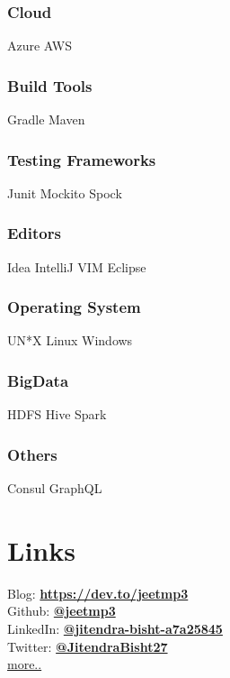 \documentclass[]{resume}
\begin{document}
\begin{minipage}[t]{0.33\textwidth}
        \subsubsection{Cloud}
        \textbullet{} Azure \textbullet{} AWS\\
        \subsubsection{Build Tools}
        \textbullet{} Gradle \textbullet{} Maven\\
        \subsubsection{Testing Frameworks}
        \textbullet{} Junit \textbullet{} Mockito \textbullet{} Spock\\
        \subsubsection{Editors}
        \textbullet{} Idea IntelliJ \textbullet{} VIM \textbullet{} Eclipse\\
        \subsubsection{Operating System}
        \textbullet{} UN*X \textbullet{} Linux \textbullet{} Windows\\
        \subsubsection{BigData}
        \textbullet{} HDFS \textbullet{} Hive \textbullet{} Spark\\
        \subsubsection{Others}
        \textbullet{} Consul \textbullet{} GraphQL\\
        \sectionsep

        \section{Links}\label{sec:links}
        Blog: \href{https://dev.to/jeetmp3}{\textbf{https://dev.to/jeetmp3}}\\
        Github: \href{https://github.com/jeetmp3}{\textbf{@jeetmp3}}\\
        LinkedIn: \href{https://www.linkedin.com/in/jitendra-bisht-a7a25845/}{\textbf{@jitendra-bisht-a7a25845}}\\
        Twitter: \href{https://twitter.com/JitendraBisht27}{\textbf{@JitendraBisht27}}\\
        \href{https://drive.google.com/file/d/1A-Ol0hMl7bzwiPwvkwAmhSSblKBC4NUc/view?usp=sharing}{more..}
        \sectionsep


\end{minipage}
\end{document}
